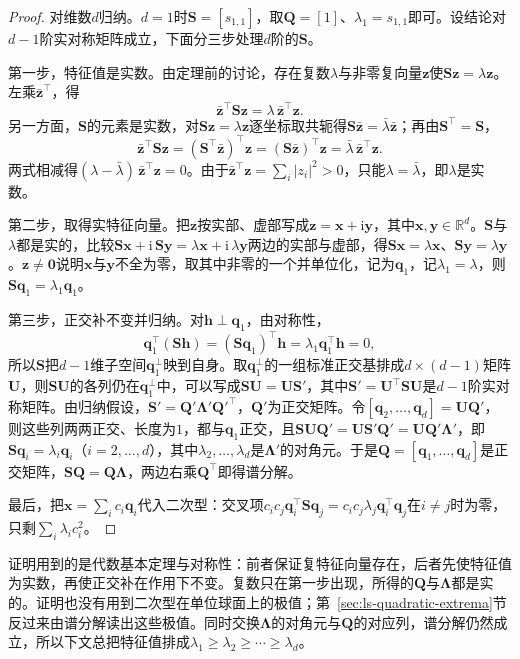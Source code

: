 \begin{proof}
对维数$d$归纳。$d=1$时$\bm S=[s_{1,1}]$，取$\bm Q=[1]$、$\lambda_1=s_{1,1}$即可。设结论对$d-1$阶实对称矩阵成立，下面分三步处理$d$阶的$\bm S$。

第一步，特征值是实数。由定理前的讨论，存在复数$\lambda$与非零复向量$\bm z$使$\bm S\bm z=\lambda\bm z$。左乘$\bar{\bm z}^\top$，得
\[
 \bar{\bm z}^\top\bm S\bm z=\lambda\,\bar{\bm z}^\top\bm z .
\]
另一方面，$\bm S$的元素是实数，对$\bm S\bm z=\lambda\bm z$逐坐标取共轭得$\bm S\bar{\bm z}=\bar\lambda\bar{\bm z}$；再由$\bm S^\top=\bm S$，
\[
 \bar{\bm z}^\top\bm S\bm z=(\bm S^\top\bar{\bm z})^\top\bm z=(\bm S\bar{\bm z})^\top\bm z=\bar\lambda\,\bar{\bm z}^\top\bm z .
\]
两式相减得$(\lambda-\bar\lambda)\,\bar{\bm z}^\top\bm z=0$。由于$\bar{\bm z}^\top\bm z=\sum_i|z_i|^2>0$，只能$\lambda=\bar\lambda$，即$\lambda$是实数。

第二步，取得实特征向量。把$\bm z$按实部、虚部写成$\bm z=\bm x+\mathrm i\bm y$，其中$\bm x,\bm y\in\mathbb R^d$。$\bm S$与$\lambda$都是实的，比较$\bm S\bm x+\mathrm i\,\bm S\bm y=\lambda\bm x+\mathrm i\,\lambda\bm y$两边的实部与虚部，得$\bm S\bm x=\lambda\bm x$、$\bm S\bm y=\lambda\bm y$。$\bm z\neq\bm0$说明$\bm x$与$\bm y$不全为零，取其中非零的一个并单位化，记为$\bm q_1$，记$\lambda_1=\lambda$，则$\bm S\bm q_1=\lambda_1\bm q_1$。

第三步，正交补不变并归纳。对$\bm h\perp\bm q_1$，由对称性，
\[
 \bm q_1^\top(\bm S\bm h)=(\bm S\bm q_1)^\top\bm h=\lambda_1\bm q_1^\top\bm h=0 ,
\]
所以$\bm S$把$d-1$维子空间$\bm q_1^\perp$映到自身。取$\bm q_1^\perp$的一组标准正交基排成$d\times(d-1)$矩阵$\bm U$，则$\bm S\bm U$的各列仍在$\bm q_1^\perp$中，可以写成$\bm S\bm U=\bm U\bm S'$，其中$\bm S'=\bm U^\top\bm S\bm U$是$d-1$阶实对称矩阵。由归纳假设，$\bm S'=\bm Q'\bm\Lambda'\bm Q'^\top$，$\bm Q'$为正交矩阵。令$[\bm q_2,\ldots,\bm q_d]=\bm U\bm Q'$，则这些列两两正交、长度为$1$，都与$\bm q_1$正交，且$\bm S\bm U\bm Q'=\bm U\bm S'\bm Q'=\bm U\bm Q'\bm\Lambda'$，即$\bm S\bm q_i=\lambda_i\bm q_i$（$i=2,\ldots,d$），其中$\lambda_2,\ldots,\lambda_d$是$\bm\Lambda'$的对角元。于是$\bm Q=[\bm q_1,\ldots,\bm q_d]$是正交矩阵，$\bm S\bm Q=\bm Q\bm\Lambda$，两边右乘$\bm Q^\top$即得谱分解。

最后，把$\bm x=\sum_ic_i\bm q_i$代入二次型：交叉项$c_ic_j\bm q_i^\top\bm S\bm q_j=c_ic_j\lambda_j\bm q_i^\top\bm q_j$在$i\neq j$时为零，只剩$\sum_i\lambda_ic_i^2$。
\end{proof}

证明用到的是代数基本定理与对称性：前者保证复特征向量存在，后者先使特征值为实数，再使正交补在作用下不变。复数只在第一步出现，所得的$\bm Q$与$\bm\Lambda$都是实的。证明也没有用到二次型在单位球面上的极值；第~\ref{sec:ls-quadratic-extrema}节反过来由谱分解读出这些极值。同时交换$\bm\Lambda$的对角元与$\bm Q$的对应列，谱分解仍然成立，所以下文总把特征值排成$\lambda_1\geq\lambda_2\geq\cdots\geq\lambda_d$。

